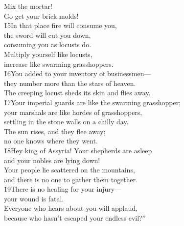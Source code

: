 \begin{poetry}
\poemll    Mix the mortar! \\
\poemlll       Go get your brick molds! \\
\poeml \v{15}In that place fire will consume you, \\
\poemll    the sword will cut you down, \\
\poemlll       consuming you as locusts do. \\
\poeml Multiply yourself like locusts, \\
\poemll    increase like swarming grasshoppers. \\
\poeml \v{16}You added to your inventory of businessmen--- \\
\poemll    they number more than the stars of heaven. \\
\poeml The creeping locust sheds its skin and flies away. \\
\poeml \v{17}Your imperial guards are like the swarming grasshopper; \\
\poemll    your marshals are like hordes of grasshoppers, \\
\poemlll       settling in the stone walls on a chilly day. \\
\poeml The sun rises, and they flee away; \\
\poemll    no one knows where they went. \\
\poeml \v{18}Hey king of Assyria! Your shepherds are asleep \\
\poemll    and your nobles are lying down! \\
\poeml Your people lie scattered on the mountains, \\
\poemll    and there is no one to gather them together. \\
\poeml \v{19}There is no healing for your injury--- \\
\poemll    your wound is fatal. \\
\poeml Everyone who hears about you will applaud, \\
\poemll    because who hasn't escaped your endless evil?''\end{poetry}
